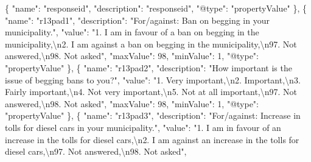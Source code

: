 \documentclass[
]{book}
\newenvironment{Shaded}{\begin{snugshade}}{\end{snugshade}}
\newcommand{\CharTok}[1]{\textcolor[rgb]{0.31,0.60,0.02}{#1}}
\newcommand{\DataTypeTok}[1]{\textcolor[rgb]{0.13,0.29,0.53}{#1}}
\newcommand{\DecValTok}[1]{\textcolor[rgb]{0.00,0.00,0.81}{#1}}
\newcommand{\FunctionTok}[1]{\textcolor[rgb]{0.00,0.00,0.00}{#1}}
\newcommand{\OtherTok}[1]{\textcolor[rgb]{0.56,0.35,0.01}{#1}}
\newcommand{\StringTok}[1]{\textcolor[rgb]{0.31,0.60,0.02}{#1}}
\begin{document}
\begin{Shaded}
\begin{Highlighting}[]
    \FunctionTok{\{}
      \DataTypeTok{"name"}\FunctionTok{:} \StringTok{"responseid"}\FunctionTok{,}
      \DataTypeTok{"description"}\FunctionTok{:} \StringTok{"responseid"}\FunctionTok{,}
      \DataTypeTok{"@type"}\FunctionTok{:} \StringTok{"propertyValue"}
    \FunctionTok{\}}\OtherTok{,}
    \FunctionTok{\{}
      \DataTypeTok{"name"}\FunctionTok{:} \StringTok{"r13pad1"}\FunctionTok{,}
      \DataTypeTok{"description"}\FunctionTok{:} \StringTok{"For/against: Ban on begging in your municipality."}\FunctionTok{,}
      \DataTypeTok{"value"}\FunctionTok{:} \StringTok{"1. I am in favour of a ban on begging in the municipality,}\CharTok{\textbackslash{}n}\StringTok{2. I am against a ban on begging in the municipality,}\CharTok{\textbackslash{}n}\StringTok{97. Not answered,}\CharTok{\textbackslash{}n}\StringTok{98. Not asked"}\FunctionTok{,}
      \DataTypeTok{"maxValue"}\FunctionTok{:} \DecValTok{98}\FunctionTok{,}
      \DataTypeTok{"minValue"}\FunctionTok{:} \DecValTok{1}\FunctionTok{,}
      \DataTypeTok{"@type"}\FunctionTok{:} \StringTok{"propertyValue"}
    \FunctionTok{\}}\OtherTok{,}
    \FunctionTok{\{}
      \DataTypeTok{"name"}\FunctionTok{:} \StringTok{"r13pad2"}\FunctionTok{,}
      \DataTypeTok{"description"}\FunctionTok{:} \StringTok{"How important is the issue of begging bans to you?"}\FunctionTok{,}
      \DataTypeTok{"value"}\FunctionTok{:} \StringTok{"1. Very important,}\CharTok{\textbackslash{}n}\StringTok{2. Important,}\CharTok{\textbackslash{}n}\StringTok{3. Fairly important,}\CharTok{\textbackslash{}n}\StringTok{4. Not very important,}\CharTok{\textbackslash{}n}\StringTok{5. Not at all important,}\CharTok{\textbackslash{}n}\StringTok{97. Not answered,}\CharTok{\textbackslash{}n}\StringTok{98. Not asked"}\FunctionTok{,}
      \DataTypeTok{"maxValue"}\FunctionTok{:} \DecValTok{98}\FunctionTok{,}
      \DataTypeTok{"minValue"}\FunctionTok{:} \DecValTok{1}\FunctionTok{,}
      \DataTypeTok{"@type"}\FunctionTok{:} \StringTok{"propertyValue"}
    \FunctionTok{\}}\OtherTok{,}
    \FunctionTok{\{}
      \DataTypeTok{"name"}\FunctionTok{:} \StringTok{"r13pad3"}\FunctionTok{,}
      \DataTypeTok{"description"}\FunctionTok{:} \StringTok{"For/against: Increase in tolls for diesel cars in your municipality."}\FunctionTok{,}
      \DataTypeTok{"value"}\FunctionTok{:} \StringTok{"1. I am in favour of an increase in the tolls for diesel cars,}\CharTok{\textbackslash{}n}\StringTok{2. I am against an increase in the tolls for diesel cars,}\CharTok{\textbackslash{}n}\StringTok{97. Not answered,}\CharTok{\textbackslash{}n}\StringTok{98. Not asked"}\FunctionTok{,}

\end{Highlighting}
\end{Shaded}
\end{document}
